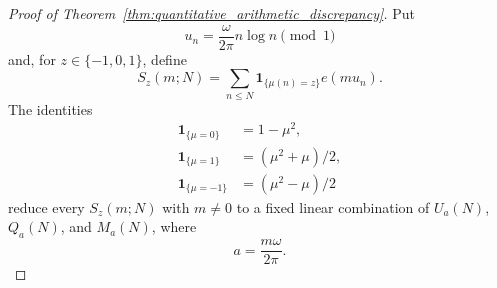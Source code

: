 \documentclass[11pt]{amsart}
\numberwithin{equation}{section}\setcounter{tocdepth}{3}\setcounter{secnumdepth}{3}
\begin{document}
\begin{proof}[Proof of Theorem~\ref{thm:quantitative_arithmetic_discrepancy}]
Put
\begin{equation}
 u_n=\frac{\omega}{2\pi}n\log n\pmod1
 \label{eq:arithmetic_normalized_phase}
\end{equation}
and, for $z\in\{-1,0,1\}$, define
\begin{equation}
 S_z(m;N)=\sum_{n\le N}\mathbf1_{\{\mu(n)=z\}}e(m u_n).
 \label{eq:arithmetic_level_fourier_sum}
\end{equation}
The identities
\begin{align}
 \mathbf1_{\{\mu=0\}}&=1-\mu^2,
 \label{eq:arithmetic_indicator_zero}\\
 \mathbf1_{\{\mu=1\}}&=(\mu^2+\mu)/2,
 \label{eq:arithmetic_indicator_plus}\\
 \mathbf1_{\{\mu=-1\}}&=(\mu^2-\mu)/2
 \label{eq:arithmetic_indicator_minus}
\end{align}
reduce every $S_z(m;N)$ with $m\ne0$ to a fixed linear combination of
$U_a(N)$, $Q_a(N)$, and $M_a(N)$, where
\begin{equation}
 a=\frac{m\omega}{2\pi}.
 \label{eq:arithmetic_frequency_parameter}
\end{equation}


\end{proof}
\end{document}

